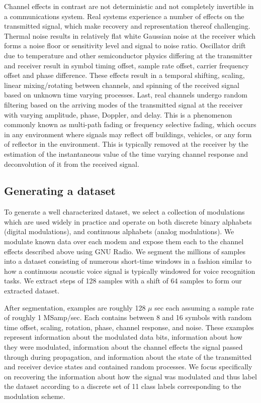 \documentclass[runningheads,a4paper]{llncs}
\begin{document}
Channel effects in contrast are not deterministic and not completely invertible in a communications system.   Real systems experience a number of effects on the transmitted signal, which make recovery and representation thereof challenging.  Thermal noise results in relatively flat white Gaussian noise at the receiver which forms a noise floor or sensitivity level and signal to noise ratio.  Oscillator drift due to temperature and other semiconductor physics differing at the transmitter and receiver result in symbol timing offset, sample rate offset, carrier frequency offset and phase difference.  These effects result in a temporal shifting, scaling, linear mixing/rotating between channels, and spinning of the received signal based on unknown time varying processes.   Last, real channels undergo random filtering based on the arriving modes of the transmitted signal at the receiver with varying amplitude, phase, Doppler, and delay.  This is a phenomenon commonly known as multi-path fading or frequency selective fading, which occurs in any environment where signals may reflect off buildings, vehicles, or any form of reflector in the environment.  This is typically removed at the receiver by the estimation of the instantaneous value of the time varying channel response and deconvolution of it from the received signal.

\subsection{Generating a dataset}

To generate a well characterized dataset, we select a collection of modulations which are used widely in practice and operate on both discrete binary alphabets (digital modulations), and continuous alphabets (analog modulations).  We modulate known data over each modem and expose them each to the channel effects described above using GNU Radio.   We segment the millions of samples into a dataset consisting of numerous short-time windows in a fashion similar to how a continuous acoustic voice signal is typically windowed for voice recognition tasks.   We extract steps of 128 samples with a shift of 64 samples to form our extracted dataset.

After segmentation, examples are roughly 128 $\mu$ sec each assuming a sample rate of roughly 1 MSamp/sec.   Each contains between 8 and 16 symbols with random time offset, scaling, rotation, phase, channel response, and noise.   These examples represent information about the modulated data bits, information about how they were modulated, information about the channel effects the signal passed through during propagation, and information about the state of the transmitted and receiver device states and contained random processes.   We focus specifically on recovering the information about how the signal was modulated and thus label the dataset according to a discrete set of 11 class labels corresponding to the modulation scheme.
\end{document}
